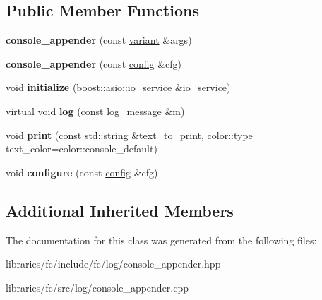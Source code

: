 \subsection*{Public Member Functions}
\begin{DoxyCompactItemize}
\item 
\mbox{\label{classfc_1_1console__appender_a0a006a1985fca8fa9168d983d2be0030}} 
{\bfseries console\+\_\+appender} (const \mbox{\hyperlink{classfc_1_1variant}{variant}} \&args)
\item 
\mbox{\label{classfc_1_1console__appender_a8f9dddd4a61b22543229631f43ace3d2}} 
{\bfseries console\+\_\+appender} (const \mbox{\hyperlink{structfc_1_1console__appender_1_1config}{config}} \&cfg)
\item 
\mbox{\label{classfc_1_1console__appender_ae574bfa08cf3f563f81baa2d05de9eba}} 
void {\bfseries initialize} (boost\+::asio\+::io\+\_\+service \&io\+\_\+service)
\item 
\mbox{\label{classfc_1_1console__appender_a0c8bd1b4b2058a5760e926065ac37437}} 
virtual void {\bfseries log} (const \mbox{\hyperlink{classfc_1_1log__message}{log\+\_\+message}} \&m)
\item 
\mbox{\label{classfc_1_1console__appender_a819864eb29982c6c82397e91a8a4ada4}} 
void {\bfseries print} (const std\+::string \&text\+\_\+to\+\_\+print, color\+::type text\+\_\+color=color\+::console\+\_\+default)
\item 
\mbox{\label{classfc_1_1console__appender_ab859b37eea5c803c674ce786f0fa64c5}} 
void {\bfseries configure} (const \mbox{\hyperlink{structfc_1_1console__appender_1_1config}{config}} \&cfg)
\end{DoxyCompactItemize}
\subsection*{Additional Inherited Members}


The documentation for this class was generated from the following files\+:\begin{DoxyCompactItemize}
\item 
libraries/fc/include/fc/log/console\+\_\+appender.\+hpp\item 
libraries/fc/src/log/console\+\_\+appender.\+cpp\end{DoxyCompactItemize}
